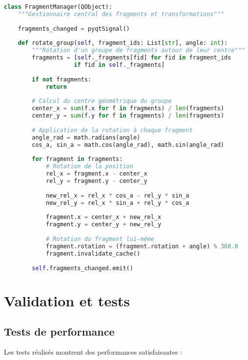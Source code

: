 \documentclass[11pt,a4paper]{report}
\begin{document}
\begin{lstlisting}[language=Python, caption=Gestion des transformations dans FragmentManager]
class FragmentManager(QObject):
    """Gestionnaire central des fragments et transformations"""
    
    fragments_changed = pyqtSignal()
    
    def rotate_group(self, fragment_ids: List[str], angle: int):
        """Rotation d'un groupe de fragments autour de leur centre"""
        fragments = [self._fragments[fid] for fid in fragment_ids 
                    if fid in self._fragments]
        
        if not fragments:
            return
        
        # Calcul du centre géométrique du groupe
        center_x = sum(f.x for f in fragments) / len(fragments)
        center_y = sum(f.y for f in fragments) / len(fragments)
        
        # Application de la rotation à chaque fragment
        angle_rad = math.radians(angle)
        cos_a, sin_a = math.cos(angle_rad), math.sin(angle_rad)
        
        for fragment in fragments:
            # Rotation de la position
            rel_x = fragment.x - center_x
            rel_y = fragment.y - center_y
            
            new_rel_x = rel_x * cos_a - rel_y * sin_a
            new_rel_y = rel_x * sin_a + rel_y * cos_a
            
            fragment.x = center_x + new_rel_x
            fragment.y = center_y + new_rel_y
            
            # Rotation du fragment lui-même
            fragment.rotation = (fragment.rotation + angle) % 360.0
            fragment.invalidate_cache()
        
        self.fragments_changed.emit()
\end{lstlisting}

\section{Validation et tests}

\subsection{Tests de performance}

Les tests réalisés montrent des performances satisfaisantes :
\end{document}
